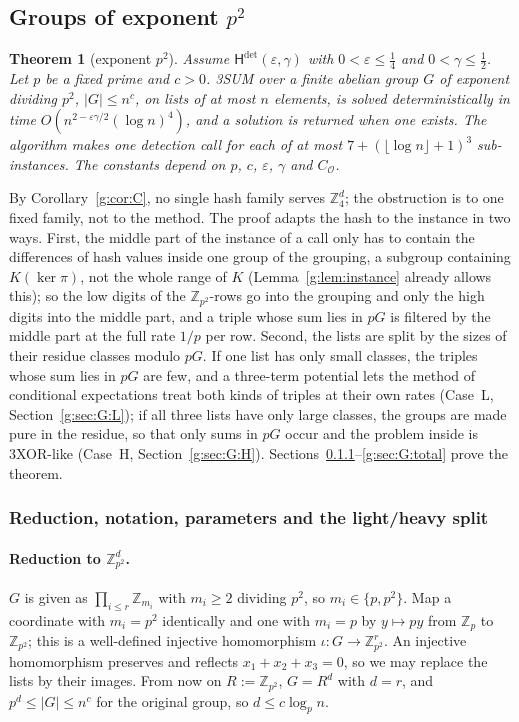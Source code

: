 \documentclass[11pt]{article}
\newtheorem{theorem}{Theorem}[section]
\theoremstyle{definition}
\theoremstyle{remark}
\newcommand{\Z}{\mathbb{Z}}
\newcommand{\eps}{\varepsilon}
\newcommand{\Hyp}{\mathsf{H}}
\begin{document}
\subsection{Groups of exponent \texorpdfstring{$p^2$}{p\^{}2}}\label{g:sec:G}

\begin{theorem}[exponent $p^2$]\label{g:thm:G}
Assume $\Hyp^{\det}(\eps,\gamma)$ with $0<\eps\le\frac14$ and $0<\gamma\le\frac12$. Let $p$ be a fixed prime and $c>0$. 3SUM over a finite abelian group $G$ of exponent dividing $p^2$, $|G|\le n^c$, on lists of at most $n$ elements, is solved deterministically in time $O(n^{2-\eps\gamma/2}(\log n)^4)$, and a solution is returned when one exists. The algorithm makes one detection call for each of at most $7+(\lfloor\log n\rfloor+1)^3$ sub-instances. The constants depend on $p$, $c$, $\eps$, $\gamma$ and $C_{\mathcal O}$.
\end{theorem}

By Corollary~\ref{g:cor:C}, no single hash family serves $\Z_4^d$; the obstruction is to one fixed family, not to the method. The proof adapts the hash to the instance in two ways. First, the middle part of the instance of a call only has to contain the differences of hash values inside one group of the grouping, a subgroup containing $K(\ker\pi)$, not the whole range of $K$ (Lemma~\ref{g:lem:instance} already allows this); so the low digits of the $\Z_{p^2}$-rows go into the grouping and only the high digits into the middle part, and a triple whose sum lies in $pG$ is filtered by the middle part at the full rate $1/p$ per row. Second, the lists are split by the sizes of their residue classes modulo $pG$. If one list has only small classes, the triples whose sum lies in $pG$ are few, and a three-term potential lets the method of conditional expectations treat both kinds of triples at their own rates (Case~L, Section~\ref{g:sec:G:L}); if all three lists have only large classes, the groups are made pure in the residue, so that only sums in $pG$ occur and the problem inside is 3XOR-like (Case~H, Section~\ref{g:sec:G:H}). Sections~\ref{g:sec:G:setup}--\ref{g:sec:G:total} prove the theorem.

\subsubsection{Reduction, notation, parameters and the light/heavy split}\label{g:sec:G:setup}

\paragraph{Reduction to $\Z_{p^2}^d$.} $G$ is given as $\prod_{i\le r}\Z_{m_i}$ with $m_i\ge2$ dividing $p^2$, so $m_i\in\{p,p^2\}$. Map a coordinate with $m_i=p^2$ identically and one with $m_i=p$ by $y\mapsto py$ from $\Z_p$ to $\Z_{p^2}$; this is a well-defined injective homomorphism $\iota\colon G\to\Z_{p^2}^r$. An injective homomorphism preserves and reflects $x_1+x_2+x_3=0$, so we may replace the lists by their images. From now on $R:=\Z_{p^2}$, $G=R^d$ with $d=r$, and $p^d\le|G|\le n^c$ for the original group, so $d\le c\log_pn$.
\end{document}
